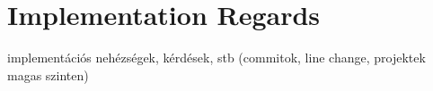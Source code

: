 \section{Implementation Regards}

implementációs nehézségek, kérdések, stb (commitok, line change, projektek magas szinten)